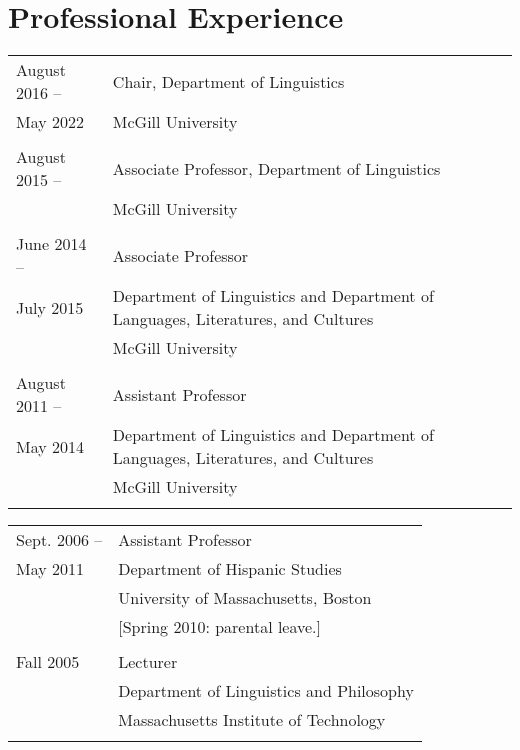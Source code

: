 \documentclass[11pt]{article}
\begin{document}
\section*{Professional Experience}

\begin{tabular}{p{2.815cm}p{280pt}}
August 2016 -- &  Chair, Department of Linguistics\\
 May 2022 &McGill University\\
 & \\[-8pt]
August 2015 -- & Associate Professor, Department of Linguistics\\
 & McGill University\\
  & \\[-8pt]
June 2014 -- &  Associate Professor\\
July 2015 & Department of Linguistics and Department of Languages, Literatures, and Cultures\\ 
& McGill University\\
& \\[-8pt]
August 2011 -- &  Assistant Professor\\
May 2014& Department of Linguistics and Department of Languages, Literatures, and Cultures\\ 
& McGill University\\
& \\[-8pt]
\end{tabular}
\begin{tabular}{p{2.815cm}p{280pt}}
Sept. 2006 -- & Assistant Professor\\
May 2011&   Department of
Hispanic Studies\\
&  University of Massachusetts, Boston\\
 &  \footnotesize{[Spring 2010: parental leave.]}\\
& \\[-8pt]
Fall 2005 & Lecturer \\
& Department of Linguistics and Philosophy \\ 
& Massachusetts Institute of Technology\\
& \\[-8pt]
\end{tabular}
\end{document}
